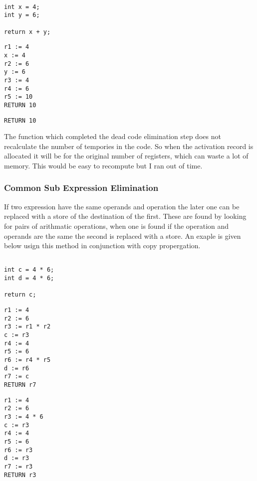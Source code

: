 \documentclass{article}
\begin{document}
\begin{minipage}{0.3\textwidth}
\begin{lstlisting}

int x = 4;
int y = 6;

return x + y;

\end{lstlisting}
\end{minipage}%
\begin{minipage}{0.3\textwidth}
\begin{lstlisting}
r1 := 4
x := 4
r2 := 6
y := 6
r3 := 4
r4 := 6
r5 := 10
RETURN 10

\end{lstlisting}
\end{minipage}%
\begin{minipage}{0.3\textwidth}
\begin{lstlisting}
RETURN 10
\end{lstlisting}
\end{minipage}%

The function which completed the dead code elimination step does not recalculate
the number of tempories in the code. So when the activation record is allocated
it will be for the original number of registers, which can waste a lot of memory.
This would be easy to recompute but I ran out of time.

\subsubsection{Common Sub Expression Elimination}
If two expression have the same operands and operation the later one can be replaced
with a store of the destination of the first. These are found by looking for pairs
of arithmatic operations, when one is found if the operation and operands are the
same the second is replaced with a store. An exaple is given below usign this method
in conjunction with copy propergation.

\begin{minipage}{0.3\textwidth}
\begin{lstlisting}

int c = 4 * 6;
int d = 4 * 6;

return c;

\end{lstlisting}
\end{minipage}%
\begin{minipage}{0.3\textwidth}
\begin{lstlisting}
r1 := 4
r2 := 6
r3 := r1 * r2
c := r3
r4 := 4
r5 := 6
r6 := r4 * r5
d := r6
r7 := c
RETURN r7
\end{lstlisting}
\end{minipage}%
\begin{minipage}{0.3\textwidth}
\begin{lstlisting}
r1 := 4
r2 := 6
r3 := 4 * 6
c := r3
r4 := 4
r5 := 6
r6 := r3
d := r3
r7 := r3
RETURN r3
\end{lstlisting}
\end{minipage}%
\end{document}
